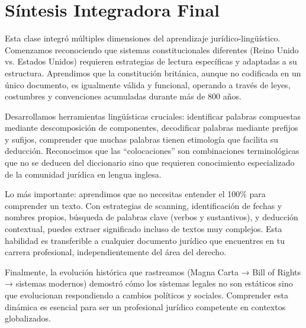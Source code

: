 \documentclass[12pt,oneside]{book}
\begin{document}
\section{Síntesis Integradora Final}

Esta clase integró múltiples dimensiones del aprendizaje jurídico-lingüístico. Comenzamos reconociendo que sistemas constitucionales diferentes (Reino Unido vs. Estados Unidos) requieren estrategias de lectura específicas y adaptadas a su estructura. Aprendimos que la constitución británica, aunque no codificada en un único documento, es igualmente válida y funcional, operando a través de leyes, costumbres y convenciones acumuladas durante más de 800 años.

Desarrollamos herramientas lingüísticas cruciales: identificar palabras compuestas mediante descomposición de componentes, decodificar palabras mediante prefijos y sufijos, comprender que muchas palabras tienen etimología que facilita su deducción. Reconocimos que las ``colocaciones'' son combinaciones terminológicas que no se deducen del diccionario sino que requieren conocimiento especializado de la comunidad jurídica en lengua inglesa.

Lo más importante: aprendimos que no necesitas entender el 100\% para comprender un texto. Con estrategias de scanning, identificación de fechas y nombres propios, búsqueda de palabras clave (verbos y sustantivos), y deducción contextual, puedes extraer significado incluso de textos muy complejos. Esta habilidad es transferible a cualquier documento jurídico que encuentres en tu carrera profesional, independientemente del área del derecho.

Finalmente, la evolución histórica que rastreamos (Magna Carta → Bill of Rights → sistemas modernos) demostró cómo los sistemas legales no son estáticos sino que evolucionan respondiendo a cambios políticos y sociales. Comprender esta dinámica es esencial para ser un profesional jurídico competente en contextos globalizados.
\end{document}
